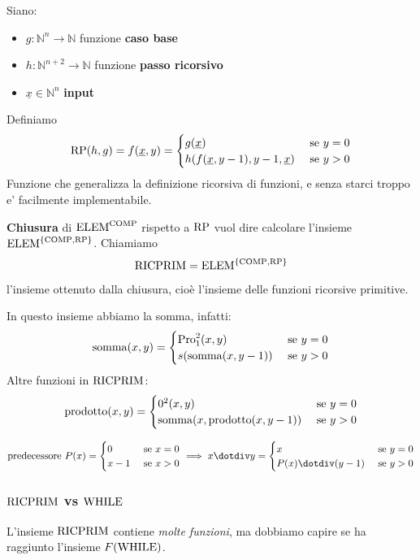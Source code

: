 Siano:
\begin{itemize}
	\item $g: \mathbb{N}^n \rightarrow \mathbb{N}$ funzione \textbf{caso base}
	\item $h: \mathbb{N}^{n+2} \rightarrow \mathbb{N}$ funzione \textbf{passo ricorsivo}
	\item $\underline{x} \in \mathbb{N}^n$ \textbf{input}
\end{itemize}

Definiamo
$$
\text{RP} (h,g) = f(\underline{x}, y) = \begin{cases}
	g(\underline{x}) & \text{ se } y = 0 \\
	h(f(\underline{x}, y-1), y-1, \underline{x}) & \text{ se } y > 0 \\
\end{cases}
$$
Funzione che generalizza la definizione ricorsiva di funzioni, e senza starci troppo e' facilmente implementabile.

\textbf{Chiusura} di $\text{ELEM}^{\text{COMP}}$ rispetto a $\text{RP}$ vuol dire calcolare l'insieme $\text{ELEM}^{\{\text{COMP}, \text{RP}\}}$. Chiamiamo
$$ \text{RICPRIM} = \text{ELEM}^{\{\text{COMP}, \text{RP}\}} $$
l'insieme ottenuto dalla chiusura, cioè l'insieme delle funzioni ricorsive primitive.

In questo insieme abbiamo la somma, infatti: 
$$
\operatorname{somma}(x,y) = \begin{cases}
	\text{Pro}_1^2 (x,y) & \text{ se } y = 0 \\
	s (\operatorname{somma}(x, y-1)) & \text{ se } y > 0 \\
\end{cases}
$$
Altre funzioni in $\text{RICPRIM}$:
$$ 
\operatorname{prodotto} (x,y) = \begin{cases}
	0^2 (x,y) & \text{ se } y = 0 \\
	\operatorname{somma}(x, \operatorname{prodotto}(x, y-1)) & \text{ se } y > 0 \\
\end{cases}
$$

$$
\predecessore \, P(x) = \begin{cases}
	0 & \text{ se } x = 0 \\
	x-1 & \text{ se } x > 0
\end{cases}
\implies 
x \dotminus y = \begin{cases}
	x & \text{ se } y = 0 \\
	P(x) \dotminus (y-1) & \text{ se $y > 0$}
\end{cases}
$$

\subsubsection{$\text{RICPRIM}$ vs $\text{WHILE}$}
L'insieme $\text{RICPRIM}$ contiene \textit{molte funzioni}, ma dobbiamo capire se ha raggiunto l'insieme $F(\text{WHILE})$.

